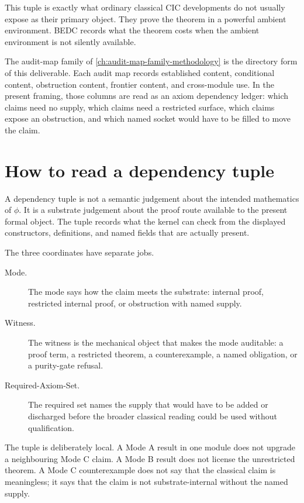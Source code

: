This tuple is exactly what ordinary classical CIC developments do not usually expose as their primary object. They prove the theorem in a powerful ambient environment. BEDC records what the theorem costs when the ambient environment is not silently available.

The audit-map family of \autoref{ch:audit-map-family-methodology} is the directory form of this deliverable. Each audit map records established content, conditional content, obstruction content, frontier content, and cross-module use. In the present framing, those columns are read as an axiom dependency ledger: which claims need no supply, which claims need a restricted surface, which claims expose an obstruction, and which named socket would have to be filled to move the claim.

\section{How to read a dependency tuple}
\label{sec:bedc-axiom-dependency-map-read-tuple}

A dependency tuple is not a semantic judgement about the intended
mathematics of $\phi$. It is a substrate judgement about the proof route
available to the present formal object. The tuple records what the kernel can
check from the displayed constructors, definitions, and named fields that are
actually present.

The three coordinates have separate jobs.

\begin{description}
\item[Mode.] The mode says how the claim meets the substrate: internal proof,
restricted internal proof, or obstruction with named supply.
\item[Witness.] The witness is the mechanical object that makes the mode
auditable: a proof term, a restricted theorem, a counterexample, a named
obligation, or a purity-gate refusal.
\item[Required-Axiom-Set.] The required set names the supply that would have
to be added or discharged before the broader classical reading could be used
without qualification.
\end{description}

The tuple is deliberately local. A Mode A result in one module does not
upgrade a neighbouring Mode C claim. A Mode B result does not license the
unrestricted theorem. A Mode C counterexample does not say that the classical
claim is meaningless; it says that the claim is not substrate-internal without
the named supply.

